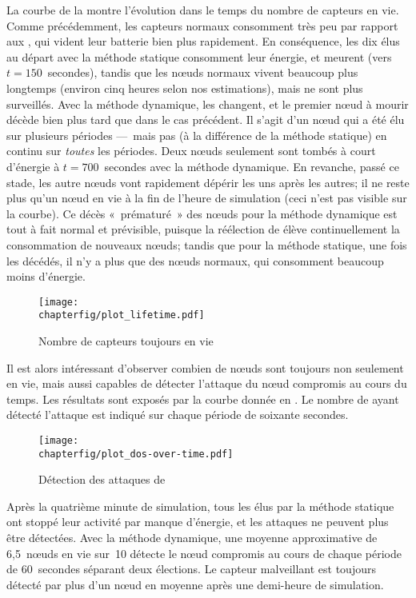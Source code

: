 La courbe de la  montre l'évolution dans le temps du nombre de capteurs en vie.
Comme précédemment, les capteurs normaux consomment très peu par rapport aux \cns, qui vident leur batterie bien plus rapidement.
En conséquence, les dix \cns élus au départ avec la méthode statique consomment leur énergie, et meurent (vers $t=150$~secondes), tandis que les nœuds normaux vivent beaucoup plus longtemps (environ cinq heures selon nos estimations), mais ne sont plus surveillés.
Avec la méthode dynamique, les \cns changent, et le premier nœud à mourir décède bien plus tard que dans le cas précédent.
Il s'agit d'un nœud qui a été élu \cn sur plusieurs périodes ---~mais pas (à la différence de la méthode statique) en continu sur \textit{toutes} les périodes.
Deux nœuds seulement sont tombés à court d'énergie à $t=700$~secondes avec la méthode dynamique.
En revanche, passé ce stade, les autre nœuds vont rapidement dépérir les uns après les autres; il ne reste plus qu'un nœud en vie à la fin de l'heure de simulation (ceci n'est pas visible sur la courbe).
Ce décès «~prématuré~» des nœuds pour la méthode dynamique est tout à fait normal et prévisible, puisque la réélection de \cns élève continuellement la consommation de nouveaux nœuds; tandis que pour la méthode statique, une fois les \cns décédés, il n'y a plus que des nœuds normaux, qui consomment beaucoup moins d'énergie.
\begin{figure}[ht]
    \centering
    \texttt{[image: \\chapterfig/plot\_lifetime.pdf]}
    \caption{Nombre de capteurs toujours en vie}\label{sa:fig:capteurs-en-vie}
\end{figure}

Il est alors intéressant d'observer combien de nœuds sont toujours non seulement en vie, mais aussi capables de détecter l'attaque du nœud compromis au cours du temps.
Les résultats sont exposés par la courbe donnée en .
Le nombre de \cns ayant détecté l'attaque est indiqué sur chaque période de soixante secondes.
\begin{figure}[ht]
    \centering
    \texttt{[image: \\chapterfig/plot\_dos-over-time.pdf]}
    \caption{Détection des attaques de \dds}\label{sa:fig:detection-dos}
\end{figure}
Après la quatrième minute de simulation, tous les \cns élus par la méthode statique ont stoppé leur activité par manque d'énergie, et les attaques ne peuvent plus être détectées.
Avec la méthode dynamique, une moyenne approximative de 6,5~nœuds en vie sur~10 détecte le nœud compromis au cours de chaque période de 60~secondes séparant deux élections.
Le capteur malveillant est toujours détecté par plus d'un nœud en moyenne après une demi-heure de simulation.
